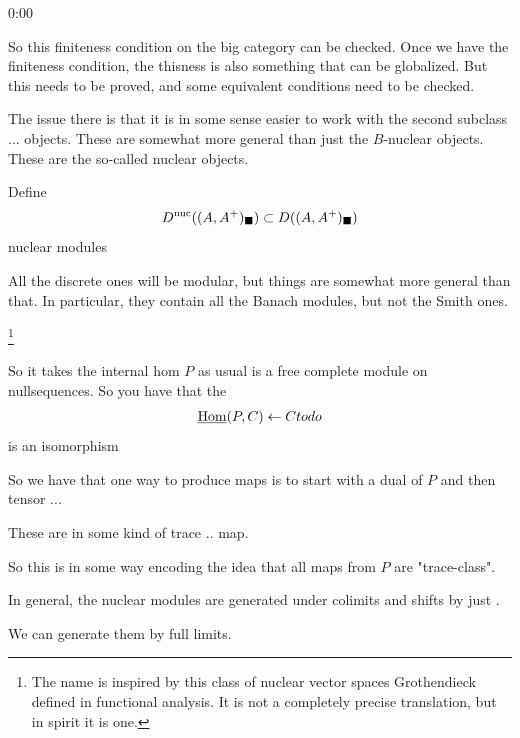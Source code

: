 \begin{unfinished}{0:00}
{\begin{theorem}
% 
So this finiteness condition on the big category can be checked. Once we have the finiteness condition, the thisness  is also something that can be globalized. But this needs to be proved, and some equivalent conditions need to be checked.

The issue there is that it is in some sense easier to work with the second subclass ... objects. These are somewhat more general than just the $B$-nuclear objects. These are the so-called nuclear objects.

Define
\begin{align*}
D^{\mathrm{nuc}}((A, A^+)_\blacksquare) \subset D((A, A^+)_\blacksquare)
\end{align*}
nuclear modules

All the discrete ones will be modular, but things are somewhat more general than that. In particular, they contain all the Banach modules, but not the Smith ones.


\footnote{The name is inspired by this class of nuclear vector spaces Grothendieck defined in functional analysis. It is not a completely precise translation, but in spirit it is one.}


So it takes the internal hom
$P$ as usual is a free complete module on nullsequences.
So you have that the 
\begin{align*}
\operatorname{\underline{Hom}}(P, C) \leftarrow C todo
\end{align*}
is an isomorphism

So we have that one way to produce maps is to start with a dual of $P$ and then tensor ...

These are in some kind of trace .. map.

So this is in some way encoding the idea that all maps from $P$ are "trace-class".


\begin{remark}

In general, the nuclear modules are generated under colimits and shifts by just .
 
We can generate them by full limits. 


\end{remark}
\end{theorem}}
\end{unfinished}
